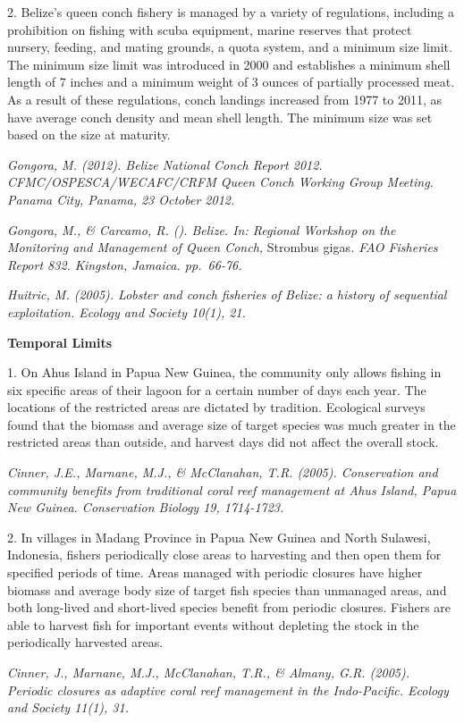 \documentclass[]{book}
\begin{document}
2. Belize's queen conch fishery is managed by a variety of regulations,
including a prohibition on fishing with scuba equipment, marine reserves
that protect nursery, feeding, and mating grounds, a quota system, and a
minimum size limit. The minimum size limit was introduced in 2000 and
establishes a minimum shell length of 7 inches and a minimum weight of 3
ounces of partially processed meat. As a result of these regulations,
conch landings increased from 1977 to 2011, as have average conch
density and mean shell length. The minimum size was set based on the
size at maturity.

\emph{Gongora, M. (2012). Belize National Conch Report 2012.
CFMC/OSPESCA/WECAFC/CRFM Queen Conch Working Group Meeting. Panama City,
Panama, 23 October 2012.}

\emph{Gongora, M., \& Carcamo, R. (). Belize. In: Regional Workshop on
the Monitoring and Management of Queen Conch,} Strombus gigas\emph{. FAO
Fisheries Report 832. Kingston, Jamaica. pp.~66-76.}

\emph{Huitric, M. (2005). Lobster and conch fisheries of Belize: a
history of sequential exploitation. Ecology and Society 10(1), 21.}

\textbf{Temporal Limits}

1. On Ahus Island in Papua New Guinea, the community only allows fishing
in six specific areas of their lagoon for a certain number of days each
year. The locations of the restricted areas are dictated by tradition.
Ecological surveys found that the biomass and average size of target
species was much greater in the restricted areas than outside, and
harvest days did not affect the overall stock.

\emph{Cinner, J.E., Marnane, M.J., \& McClanahan, T.R. (2005).
Conservation and community benefits from traditional coral reef
management at Ahus Island, Papua New Guinea. Conservation Biology 19,
1714-1723.}

2. In villages in Madang Province in Papua New Guinea and North
Sulawesi, Indonesia, fishers periodically close areas to harvesting and
then open them for specified periods of time. Areas managed with
periodic closures have higher biomass and average body size of target
fish species than unmanaged areas, and both long-lived and short-lived
species benefit from periodic closures. Fishers are able to harvest fish
for important events without depleting the stock in the periodically
harvested areas.

\emph{Cinner, J., Marnane, M.J., McClanahan, T.R., \& Almany, G.R.
(2005). Periodic closures as adaptive coral reef management in the
Indo-Pacific. Ecology and Society 11(1), 31.}
\end{document}
